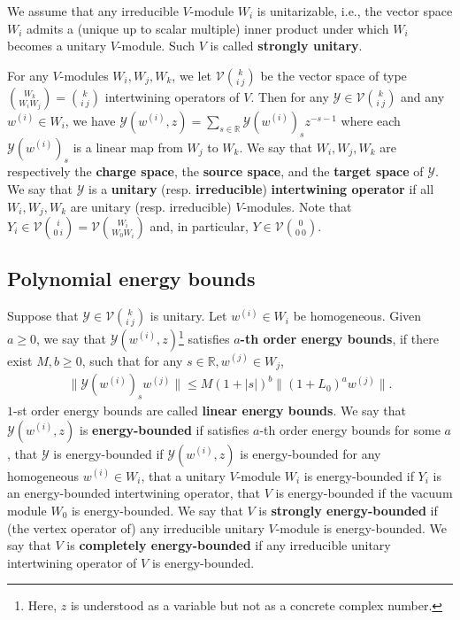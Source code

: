 \documentclass[11pt,b5paper,notitlepage]{article}
\theoremstyle{definition}
\theoremstyle{plain}
\newcommand{\mc}{\mathcal}
\newcommand{\mbb}{\mathbb}
\numberwithin{equation}{subsection}
\begin{document}
We assume that any irreducible $V$-module $W_i$ is unitarizable, i.e., the vector space $W_i$ admits a (unique up to scalar multiple) inner product under which $W_i$ becomes a unitary $V$-module. Such $V$ is called \textbf{strongly unitary}. 



For any $V$-modules $W_i,W_j,W_k$, we let $\mc V{k\choose i~j}$ be the vector space of type ${W_k\choose W_iW_j}={k\choose i~j}$ intertwining operators of $V$.  Then for any $\mc Y\in\mc V{k\choose i~j}$  and any $w^{(i)}\in W_i$, we have $\mc Y(w^{(i)},z)=\sum_{s\in\mbb R}\mc Y(w^{(i)})_sz^{-s-1}$ where each $\mc Y(w^{(i)})_s$ is a linear map from $W_j$ to $W_k$. We say that $W_i,W_j,W_k$ are respectively the \textbf{charge space}, the \textbf{source space}, and the \textbf{target space} of $\mc Y$. We say that $\mc Y$ is a \textbf{unitary} (resp. \textbf{irreducible}) \textbf{intertwining operator} if all $W_i,W_j,W_k$ are unitary (resp. irreducible) $V$-modules. Note that $Y_i\in\mc V{i\choose 0~i}=\mc V{W_i\choose W_0W_i}$ and, in particular, $Y\in\mc V{0\choose 0~0}$. 


\subsection{Polynomial energy bounds}\label{lb69}

Suppose that $\mc Y\in\mc V{k\choose i~j}$ is unitary. Let $w^{(i)}\in W_i$ be homogeneous. Given $a\geq 0$, we say that $\mc Y(w^{(i)},z)$\footnote{Here, $z$ is understood as a variable but not as a concrete complex number.} satisfies \textbf{$a$-th order energy bounds}, if there exist $M,b\geq0$, such that for any $s\in\mathbb R,w^{(j)}\in W_j$, 
\begin{align}
\lVert \mc Y(w^{(i)})_sw^{(j)} \lVert\leq M(1+|s|)^b\lVert (1+L_0)^aw^{(j)}\lVert.
\end{align}
$1$-st order energy bounds are called \textbf{linear energy bounds}. We say that $\mc Y(w^{(i)},z)$ is \textbf{energy-bounded} if satisfies $a$-th order energy bounds for some $a$, that $\mc Y$ is energy-bounded if $\mc Y(w^{(i)},z)$ is energy-bounded for any homogeneous $w^{(i)}\in W_i$, that a unitary $V$-module $W_i$ is energy-bounded if $Y_i$ is an energy-bounded intertwining operator, that $V$ is energy-bounded if the vacuum module $W_0$ is energy-bounded. We say that $V$ is \textbf{strongly energy-bounded} if (the vertex operator of) any irreducible unitary $V$-module is energy-bounded. We say that $V$ is \textbf{completely energy-bounded} if any irreducible unitary intertwining operator of $V$ is energy-bounded.
\end{document}
